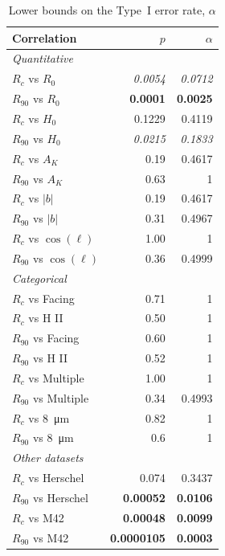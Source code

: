 \begin{table}
  \caption{Lower bounds on the Type~I error rate, \(\alpha\)}
  \label{tab:type-I}
  \centering
  \begin{tabular}{lrr} \toprule
    Correlation & \(p\) & \(\alpha\) \\
    \midrule
    \multicolumn{3}{l}{\itshape Quantitative \dotfill}\\
    \(R_c\) vs \(R_0\) & \textit{0.0054} & \textit{0.0712} \\
    \(R_{90}\) vs \(R_0\) & \textbf{0.0001} & \textbf{0.0025} \\
    \(R_c\) vs \(H_0\) & 0.1229 & 0.4119 \\
    \(R_{90}\) vs \(H_0\) & \textit{0.0215} & \textit{0.1833} \\
    \(R_c\) vs \(A_K\) & 0.19 & 0.4617 \\
    \(R_{90}\) vs \(A_K\) & 0.63 & 1 \\
    \(R_c\) vs \(|b|\) & 0.19 & 0.4617 \\
    \(R_{90}\) vs \(|b|\) & 0.31 & 0.4967 \\
    \(R_c\) vs \(\cos(\ell)\) & 1.00 & 1 \\
    \(R_{90}\) vs \(\cos(\ell)\) & 0.36 & 0.4999 \\
    \midrule
    \multicolumn{3}{l}{\itshape Categorical} \dotfill\\
    \(R_c\) vs Facing & 0.71 & 1 \\
    \(R_c\) vs H II & 0.50 & 1 \\
    \(R_{90}\) vs Facing & 0.60 & 1 \\
    \(R_{90}\) vs H II & 0.52 & 1 \\
    \(R_c\) vs Multiple & 1.00 & 1 \\
    \(R_{90}\) vs Multiple & 0.34 & 0.4993 \\
    \(R_c\) vs \SI{8}{\um} & 0.82 & 1 \\
    \(R_{90}\) vs \SI{8}{\um} & 0.6 & 1 \\
    \midrule
    \multicolumn{3}{l}{\itshape Other datasets} \dotfill\\
    \(R_c\) vs Herschel & 0.074 & 0.3437 \\
    \(R_{90}\) vs Herschel & \textbf{0.00052} & \textbf{0.0106} \\
    \(R_c\) vs M42 & \textbf{0.00048} & \textbf{0.0099} \\
    \(R_{90}\) vs M42 & \textbf{0.0000105} & \textbf{0.0003} \\
    \bottomrule
  \end{tabular}
\end{table}


